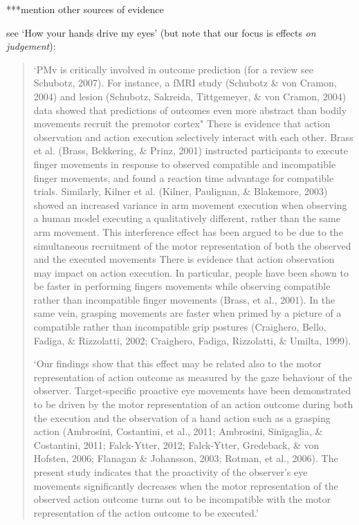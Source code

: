 \documentclass[12pt,\papersize]{extarticle}
\begin{document}
***mention other sources of evidence

see `How your hands drive my eyes' (but note that our focus is effects \emph{on judgement}):
\begin{quote}
 `PMv is critically involved in outcome prediction (for a review see Schubotz, 2007). For instance, a fMRI study (Schubotz \& von Cramon, 2004) and lesion (Schubotz, Sakreida, Tittgemeyer, \& von Cramon, 2004) data showed that predictions of outcomes even more abstract than bodily movements recruit the premotor cortex"
There is evidence that action observation and action execution selectively interact with each other. Brass et al. (Brass, Bekkering, \& Prinz, 2001) instructed participants to execute finger movements in response to observed compatible and incompatible finger movements, and found a reaction time advantage for compatible trials. Similarly, Kilner et al. (Kilner, Paulignan, \& Blakemore, 2003) showed an increased variance in arm movement execution when observing a human model executing a qualitatively different, rather than the same arm movement. This interference effect has been argued to be due to the simultaneous recruitment of the motor representation of both the observed and the executed movements
There is evidence that action observation may impact on action execution. In particular, people have been shown to be faster in performing fingers movements while observing compatible rather than incompatible finger movements (Brass, et al., 2001). In the same vein, grasping movements are faster when primed by a picture of a compatible rather than incompatible grip postures (Craighero, Bello, Fadiga, \& Rizzolatti, 2002; Craighero, Fadiga, Rizzolatti, \& Umilta, 1999). 

`Our findings show that this effect may be related also to the motor representation of action outcome as measured by the gaze behaviour of the observer. Target-specific proactive eye movements have been demonstrated to be driven by the motor representation of an action outcome during both the execution and the observation of a hand action such as a grasping action (Ambrosini, Costantini, et al., 2011; Ambrosini, Sinigaglia, \& Costantini, 2011; Falck-Ytter, 2012; Falck-Ytter, Gredeback, \& von Hofsten, 2006; Flanagan \& Johansson, 2003; Rotman, et al., 2006). The present study indicates that the proactivity of the observer's eye movements significantly decreases when the motor representation of the observed action outcome turns out to be incompatible with the motor representation of the action outcome to be executed.'
\end{quote}
\end{document}
